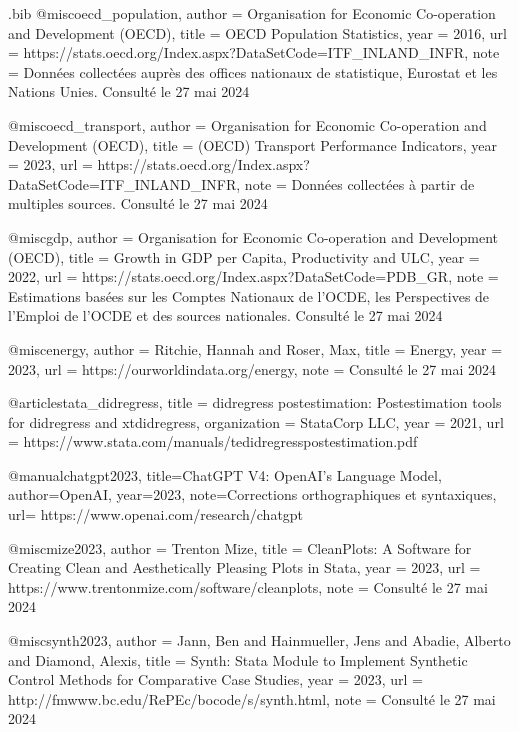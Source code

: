 \begin{filecontents}{.bib}
@misc{oecd_population,
  author = {{Organisation for Economic Co-operation and Development (OECD)}},
  title = {OECD Population Statistics},
  year = {2016},
  url = {https://stats.oecd.org/Index.aspx?DataSetCode=ITF_INLAND_INFR},
  note = {Données collectées auprès des offices nationaux de statistique, Eurostat et les Nations Unies. Consulté le 27 mai 2024}
}


@misc{oecd_transport,
  author = {{Organisation for Economic Co-operation and Development (OECD)}},
  title = {(OECD) Transport Performance Indicators},
  year = {2023},
  url = {https://stats.oecd.org/Index.aspx?DataSetCode=ITF_INLAND_INFR},
  note = {Données collectées à partir de multiples sources. Consulté le 27 mai 2024}
}

@misc{gdp,
  author = {{Organisation for Economic Co-operation and Development (OECD)}},
  title = {Growth in GDP per Capita, Productivity and ULC},
  year = {2022},
  url = {https://stats.oecd.org/Index.aspx?DataSetCode=PDB_GR},
  note = {Estimations basées sur les Comptes Nationaux de l'OCDE, les Perspectives de l'Emploi de l'OCDE et des sources nationales. Consulté le 27 mai 2024}
}

@misc{energy,
  author = {{Ritchie, Hannah and Roser, Max}},
  title = {Energy},
  year = {2023},
  url = {https://ourworldindata.org/energy},
  note = {Consulté le 27 mai 2024}
}

@article{stata_didregress,
  title = {{didregress postestimation: Postestimation tools for didregress and xtdidregress}},
  organization = {StataCorp LLC},
  year = {2021},
  url = {https://www.stata.com/manuals/tedidregresspostestimation.pdf}
}

@manual{chatgpt2023,
  title={ChatGPT V4: OpenAI’s Language Model},
  author={OpenAI},
  year={2023},
  note={Corrections orthographiques et syntaxiques},
  url= {https://www.openai.com/research/chatgpt}
}

@misc{mize2023,
  author = {{Trenton Mize}},
  title = {CleanPlots: A Software for Creating Clean and Aesthetically Pleasing Plots in Stata},
  year = {2023},
  url = {https://www.trentonmize.com/software/cleanplots},
  note = {Consulté le 27 mai 2024}
}


@misc{synth2023,
  author = {{Jann, Ben and Hainmueller, Jens and Abadie, Alberto and Diamond, Alexis}},
  title = {Synth: Stata Module to Implement Synthetic Control Methods for Comparative Case Studies},
  year = {2023},
  url = {http://fmwww.bc.edu/RePEc/bocode/s/synth.html},
  note = {Consulté le 27 mai 2024}
}



\end{filecontents}



